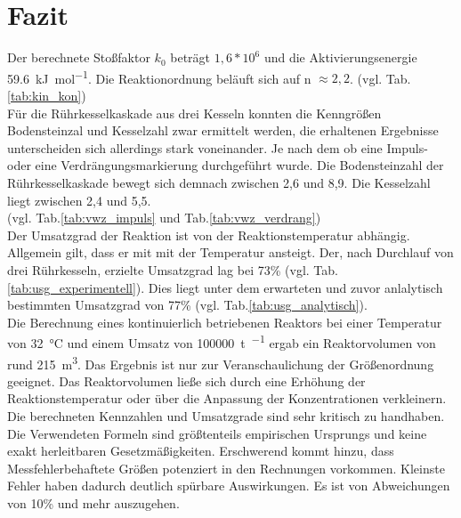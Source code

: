 \pagebreak
\section{Fazit}
\label{sec:fazit}

Der berechnete Stoßfaktor $k_0$ beträgt $1,6*10^6$ und die Aktivierungsenergie \SI{59,6}{\kilo\joule\per\mole}. Die Reaktionordnung beläuft sich auf n $\approx2,2$.  (vgl. Tab.\ref{tab:kin_kon})\\


Für die Rührkesselkaskade aus drei Kesseln konnten die Kenngrößen Bodensteinzal und Kesselzahl zwar ermittelt werden, die erhaltenen Ergebnisse unterscheiden sich allerdings stark voneinander. Je nach dem ob eine Impuls- oder eine Verdrängungsmarkierung durchgeführt wurde. Die Bodensteinzahl der Rührkesselkaskade bewegt sich demnach zwischen 2,6 und 8,9. Die Kesselzahl liegt zwischen 2,4 und 5,5.\\ (vgl. Tab.\ref{tab:vwz_impuls} und Tab.\ref{tab:vwz_verdrang})\\

Der Umsatzgrad der Reaktion ist von der Reaktionstemperatur abhängig. Allgemein gilt, dass er mit mit der Temperatur ansteigt. Der, nach Durchlauf von drei Rührkesseln, erzielte Umsatzgrad lag bei 73\% (vgl. Tab.\ref{tab:usg_experimentell}). Dies liegt unter dem erwarteten und zuvor anlalytisch bestimmten Umsatzgrad von 77\% (vgl. Tab.\ref{tab:usg_analytisch}). \\

Die Berechnung eines kontinuierlich betriebenen Reaktors bei einer Temperatur von \SI{32}{\degreeCelsius} und einem Umsatz von \SI{100000}{\tonne\per\year} ergab ein Reaktorvolumen von rund \SI{215}{\cubic\meter}. Das Ergebnis ist nur zur Veranschaulichung der Größenordnung geeignet. Das Reaktorvolumen ließe sich durch eine Erhöhung der Reaktionstemperatur oder über die Anpassung der Konzentrationen verkleinern.\\ 

Die berechneten Kennzahlen und Umsatzgrade sind sehr kritisch zu handhaben. Die Verwendeten Formeln sind größtenteils empirischen Ursprungs und keine exakt herleitbaren Gesetzmäßigkeiten. Erschwerend kommt hinzu, dass Messfehlerbehaftete Größen potenziert in den Rechnungen vorkommen. Kleinste Fehler haben dadurch deutlich spürbare Auswirkungen. Es ist von Abweichungen von 10\% und mehr auszugehen.
 



